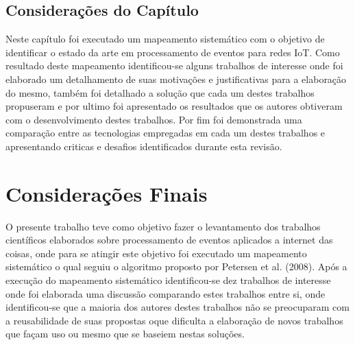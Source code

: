 \documentclass[tid,table]{texufpel} %
\begin{document}
\section{Considerações do Capítulo}

Neste capítulo foi executado um mapeamento sistemático com o objetivo de  identificar o estado da arte em processamento de eventos para redes IoT. Como resultado deste mapeamento identificou-se alguns trabalhos de interesse onde foi elaborado um detalhamento de suas motivações e justificativas para a elaboração do mesmo, também foi detalhado a solução que cada um destes trabalhos propuseram e por ultimo foi apresentado os resultados que os autores obtiveram com o desenvolvimento destes trabalhos. Por fim foi demonstrada uma comparação entre as tecnologias empregadas em cada um destes trabalhos e apresentando criticas e desafios identificados durante esta revisão. 


\chapter{Considerações Finais}
\label{cap:Consideracoes_Finais}

O presente trabalho teve como objetivo fazer o levantamento dos trabalhos científicos elaborados sobre processamento de eventos aplicados a internet das coisas, onde para se atingir este objetivo foi executado um mapeamento sistemático o qual seguiu o algoritmo proposto por Petersen et al. (2008). Após a execução do mapeamento sistemático identificou-se dez trabalhos de interesse onde foi elaborada uma discussão comparando estes trabalhos entre si, onde identificou-se que a maioria dos autores destes trabalhos não se preocuparam com a reusabilidade de suas propostas oque dificulta a elaboração de novos trabalhos que façam uso ou mesmo que se baseiem nestas soluções.





\end{document}
